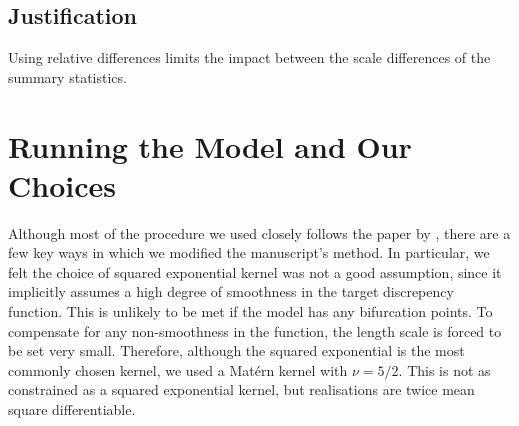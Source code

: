 \subsection*{Justification}

Using relative differences limits the impact between the scale differences of the summary statistics.

\section{Running the Model and Our Choices}

Although most of the procedure we used closely follows the paper by
\cite{gutmann_bayesian_2016}, there are a few key ways in which we modified the
manuscript's method. In particular, we felt the choice of squared exponential
kernel was not a good assumption, since it implicitly assumes a high degree of
smoothness in the target discrepency function. This is unlikely to be met if
the model has any bifurcation points. To compensate for any non-smoothness in
the function, the length scale is forced to be set very small. Therefore,
although the squared exponential is the most commonly chosen kernel,
we used a Mat\'ern kernel with $\nu = 5/2$. This is not as constrained as a
squared exponential kernel, but realisations are twice mean square
differentiable.

